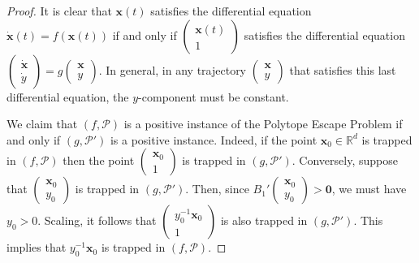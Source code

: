 \begin{proof}
It is clear that $\boldsymbol{x}(t)$ satisfies the differential equation
$\dot{\boldsymbol{x}}(t)=f(\boldsymbol{x}(t))$ if and only if
$\begin{pmatrix}
\boldsymbol{x}(t)\\1 \end{pmatrix}$ satisfies
the differential equation
$\begin{pmatrix}\dot{\boldsymbol{x}}\\
\dot{y}
\end{pmatrix} = g\begin{pmatrix}\boldsymbol{x}\\y
\end{pmatrix}$.  In general,
in any trajectory $\begin{pmatrix}\boldsymbol{x}\\y
\end{pmatrix}$ that satisfies this last differential equation, the
$y$-component must be constant.

We claim that $(f,\mathcal{P})$ is a positive instance
of the Polytope Escape Problem if and
only if $(g,\mathcal{P}')$ is a positive instance.
Indeed, if the point
$\boldsymbol{x}_0 \in \mathbb{R}^d$ is trapped
in $(f,\mathcal{P})$
then the point $\begin{pmatrix}\boldsymbol{x}_0\\1
\end{pmatrix}$ is trapped in $(g,\mathcal{P}')$.
Conversely, suppose that $\begin{pmatrix}\boldsymbol{x}_0\\y_0
\end{pmatrix}$ is trapped in  $(g,\mathcal{P}')$.  Then,
since $B_{1}'\begin{pmatrix}\boldsymbol{x}_0\\y_0
\end{pmatrix}
> \boldsymbol{0}$,
we must have $y_0>0$.  Scaling, it follows that
$\begin{pmatrix} y_0^{-1}\boldsymbol{x}_0\\1
\end{pmatrix}$ is also trapped in $(g,\mathcal{P}')$.  This implies
that $y_0^{-1}\boldsymbol{x}_0$ is trapped in $(f,\mathcal{P})$.
%
\end{proof}

